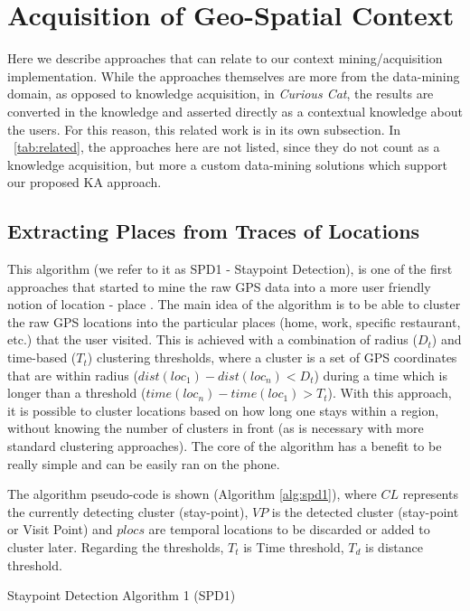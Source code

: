 \section{Acquisition of Geo-Spatial Context}
Here we describe approaches that can relate to our 
context mining/acquisition implementation. While the approaches themselves are
more from the data-mining domain, as opposed to knowledge acquisition, in
\emph{Curious Cat}, the results are converted in the knowledge and asserted 
directly as a contextual knowledge about the users. For this reason, this
related work is in its own subsection. In \tablename~\ref{tab:related}, the 
approaches here are not listed, since they do not count as a knowledge
acquisition, but more a custom data-mining solutions which support our
proposed KA approach.

\subsection{Extracting Places from Traces of Locations}
\label{section:SPD1}
This algorithm (we refer to it as SPD1 - Staypoint Detection), is one of the 
first approaches that started to mine the raw GPS data into a more user friendly notion of location - place \parencite{Kang2005}. The main
idea of the algorithm is to be able to cluster the raw GPS locations into the
particular places (home, work, specific restaurant, etc.) that the user visited. 
This is achieved with a combination of radius ($D_t$) and time-based ($T_t$) 
clustering thresholds, where a cluster is a set of GPS coordinates that are 
within radius ($dist(loc_1) - dist(loc_n) < D_t$) during a time which is longer 
than a threshold ($time(loc_n)-time(loc_1) > T_t$). With this approach, it is
possible to cluster locations based on how long one stays within a region, 
without knowing the number of clusters in front (as is necessary with more
standard clustering approaches). The core of the algorithm has a benefit
to be really simple and can be easily ran on the phone.

The algorithm pseudo-code is shown (Algorithm \ref{alg:spd1}), where $CL$ 
represents the currently detecting cluster (stay-point), $VP$ is the detected cluster (stay-point or Visit Point) and $plocs$ are temporal locations to be discarded or added to cluster
later. Regarding the thresholds, $T_t$ is Time threshold, $T_d$ is distance 
threshold.

\begin{algorithm}[htb]
\caption{Staypoint Detection Algorithm 1 (SPD1)}
\label{alg:spd1}

\vspace{5pt}
\vspace{5pt}
{
}
\end{algorithm}

